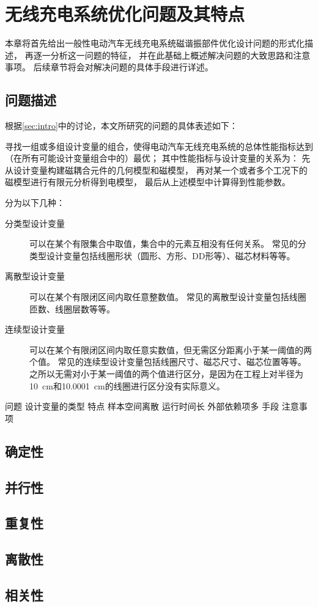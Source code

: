 \documentclass[index]{subfiles}
\begin{document}
\chapter{无线充电系统优化问题及其特点}\label{sec:fea}
本章将首先给出一般性电动汽车无线充电系统磁谐振部件优化设计问题的形式化描述，
再逐一分析这一问题的特征，
并在此基础上概述解决问题的大致思路和注意事项。
后续章节将会对解决问题的具体手段进行详述。

\section{问题描述}
根据\cref{sec:intro}中的讨论，本文所研究的问题的具体表述如下：

\begin{definition}[一般性电动汽车无线充电系统磁谐振部件优化设计问题]
  寻找一组或多组设计变量的组合，使得电动汽车无线充电系统的总体性能指标达到（在所有可能设计变量组合中的）最优；
  其中性能指标与设计变量的关系为：
  先从设计变量构建磁耦合元件的几何模型和磁模型，
  再对某一个或者多个工况下的磁模型进行有限元分析得到电模型，
  最后从上述模型中计算得到性能参数。
\end{definition}

\begin{definition}[设计变量]
  分为以下几种：
  \begin{description}
    \item[分类型设计变量] 可以在某个有限集合中取值，集合中的元素互相没有任何关系。
      常见的分类型设计变量包括线圈形状（圆形、方形、DD形等）、磁芯材料等等。
    \item[离散型设计变量] 可以在某个有限闭区间内取任意整数值。
    常见的离散型设计变量包括线圈匝数、线圈层数等等。
    \item[连续型设计变量] 可以在某个有限闭区间内取任意实数值，但无需区分距离小于某一阈值的两个值。
      常见的连续型设计变量包括线圈尺寸、磁芯尺寸、磁芯位置等等。
      之所以无需对小于某一阈值的两个值进行区分，是因为在工程上对半径为\SI{10}{\centi\meter}和\SI{10.0001}{\centi\meter}的线圈进行区分没有实际意义。
  \end{description}
\end{definition}
问题 设计变量的类型
特点 样本空间离散 运行时间长 外部依赖项多
手段 
注意事项

\section{确定性}
\section{并行性}
\section{重复性}
\section{离散性}\label{sec:fea-discrete}
\section{相关性}
\end{document}
